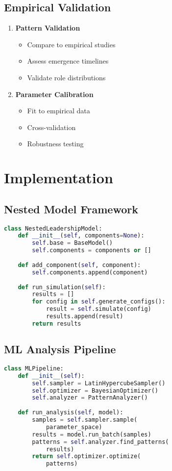 \documentclass[12pt]{article}
\begin{document}
\subsection{Empirical Validation}
\begin{enumerate}
    \item \textbf{Pattern Validation}
    \begin{itemize}
        \item Compare to empirical studies
        \item Assess emergence timelines
        \item Validate role distributions
    \end{itemize}

    \item \textbf{Parameter Calibration}
    \begin{itemize}
        \item Fit to empirical data
        \item Cross-validation
        \item Robustness testing
    \end{itemize}
\end{enumerate}

\section{Implementation}

\subsection{Nested Model Framework}
\begin{lstlisting}[language=Python, caption=Nested Model Implementation]
class NestedLeadershipModel:
    def __init__(self, components=None):
        self.base = BaseModel()
        self.components = components or []
        
    def add_component(self, component):
        self.components.append(component)
        
    def run_simulation(self):
        results = []
        for config in self.generate_configs():
            result = self.simulate(config)
            results.append(result)
        return results
\end{lstlisting}

\subsection{ML Analysis Pipeline}
\begin{lstlisting}[language=Python, caption=ML Analysis Implementation]
class MLPipeline:
    def __init__(self):
        self.sampler = LatinHypercubeSampler()
        self.optimizer = BayesianOptimizer()
        self.analyzer = PatternAnalyzer()
        
    def run_analysis(self, model):
        samples = self.sampler.sample(
            parameter_space)
        results = model.run_batch(samples)
        patterns = self.analyzer.find_patterns(
            results)
        return self.optimizer.optimize(
            patterns)
\end{lstlisting}
\end{document}
